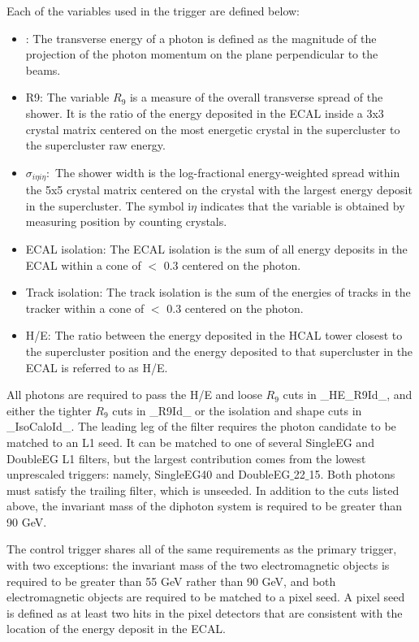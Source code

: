 Each of the variables used in the trigger are defined below:

\begin{itemize}
\item{\ET:} The transverse energy \ET of a photon is defined
as the magnitude of the projection
of the photon momentum on the plane perpendicular to the beams.
\item{R9:} The variable $R_9$ is
a measure of the overall transverse spread of the shower. It is the ratio
of the energy deposited in the ECAL inside a 3x3 crystal matrix centered on
the most energetic crystal in the supercluster to the supercluster
 raw energy.
\item{$\sigma_{i\eta i \eta}:$} The shower width \sigmaietaieta is
      the log-fractional energy-weighted spread within the 5x5 crystal matrix centered on the
      crystal with the largest energy deposit in the supercluster. The symbol
      i$\eta$ indicates that the variable is obtained by measuring position by
      counting crystals.
\item{ECAL isolation:} The ECAL isolation is
      the sum of all energy deposits in the ECAL within a cone of \dR
      $<$ 0.3 centered on the photon.
\item{Track isolation:} The track isolation is
      the sum of the energies of tracks in the tracker within a cone of \dR
      $<$ 0.3 centered on the photon.
\item{H/E:} The ratio between the energy deposited in the HCAL
      tower closest to the supercluster position and the energy deposited to
      that supercluster in the ECAL is referred to as H/E.
  \end{itemize}

All photons are required to pass the H/E and loose $R_9$ cuts in
\_HE\_R9Id\_, and either the tighter $R_9$ cuts in
\_R9Id\_ or the isolation and shape cuts in \_IsoCaloId\_.
The leading leg of the filter requires the photon candidate
to be matched to an L1 seed. It can be matched to one of several
SingleEG and DoubleEG L1 filters, but the largest contribution comes
from the lowest unprescaled triggers: namely, SingleEG40 and
DoubleEG$\_$22$\_$15.
Both photons must satisfy the trailing filter, which is unseeded.
In addition to the cuts listed above, the invariant mass of
the diphoton system is required to be greater than 90 GeV.

The control trigger shares all of the same requirements as the primary trigger, with two exceptions: 
the invariant mass of the two electromagnetic objects is required to be greater than 55 GeV rather than 90 GeV, 
and both electromagnetic objects are required to be matched to a pixel seed. A pixel seed is defined
as at least two hits in the pixel detectors that are consistent with the location of the energy deposit in the ECAL. 

